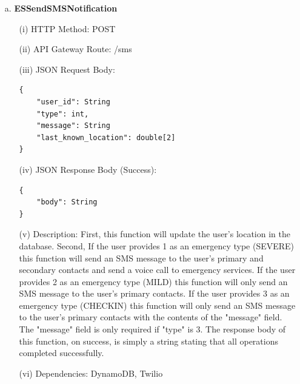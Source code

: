 \documentclass[10pt, a4paper]{article}
\begin{document}
	\begin{enumerate}
	\item[a.] \textbf{ESSendSMSNotification}
		\begin{itemize}		
		\item[(i)] HTTP Method: POST
		\item[(ii)] API Gateway Route: /sms
		\item[(iii)] JSON Request Body:
			\begin{lstlisting}
{
	"user_id": String
	"type": int,
	"message": String
	"last_known_location": double[2]
}
			\end{lstlisting}
		\item[(iv)] JSON Response Body (Success):
			\begin{lstlisting}
{
	"body": String
}
			\end{lstlisting}
		\item[(v)] Description: First, this function will update the user's location in the database. Second, If the user provides 1 as an emergency type (SEVERE) this function will send an SMS message to the user's primary and secondary contacts and send a voice call to emergency services. If the user provides 2 as an emergency type (MILD) this function will only send an SMS message to the user's primary contacts. If the user provides 3 as an emergency type (CHECKIN) this function will only send an SMS message to the user's primary contacts with the contents of the "message" field. The "message" field is only required if "type" is 3. The response body of this function, on success, is simply a string stating that all operations completed successfully.
		\item[(vi)] Dependencies: DynamoDB, Twilio
		\end{itemize}
		

\end{enumerate}
\end{document}
